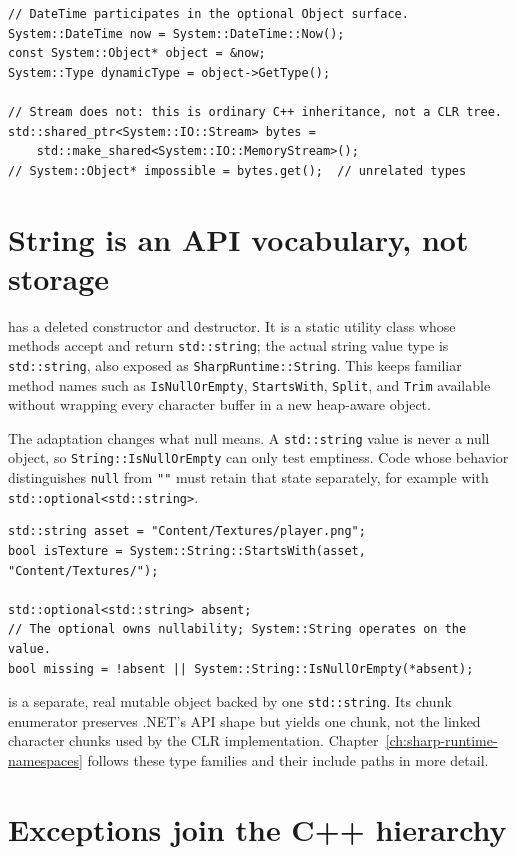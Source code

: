 \begin{lstlisting}
// DateTime participates in the optional Object surface.
System::DateTime now = System::DateTime::Now();
const System::Object* object = &now;
System::Type dynamicType = object->GetType();

// Stream does not: this is ordinary C++ inheritance, not a CLR tree.
std::shared_ptr<System::IO::Stream> bytes =
    std::make_shared<System::IO::MemoryStream>();
// System::Object* impossible = bytes.get();  // unrelated types
\end{lstlisting}

\section{String is an API vocabulary, not storage}

 has a deleted constructor and destructor. It is a static utility
class whose methods accept and return \texttt{std::string}; the actual string value type is
\texttt{std::string}, also exposed as \texttt{SharpRuntime::String}. This keeps familiar
method names such as \texttt{IsNullOrEmpty}, \texttt{StartsWith}, \texttt{Split}, and
\texttt{Trim} available without wrapping every character buffer in a new heap-aware object.

The adaptation changes what null means. A \texttt{std::string} value is never a null object,
so \texttt{String::IsNullOrEmpty} can only test emptiness. Code whose behavior distinguishes
\texttt{null} from \texttt{""} must retain that state separately, for example with
\texttt{std::optional<std::string>}.

\begin{lstlisting}
std::string asset = "Content/Textures/player.png";
bool isTexture = System::String::StartsWith(asset, "Content/Textures/");

std::optional<std::string> absent;
// The optional owns nullability; System::String operates on the value.
bool missing = !absent || System::String::IsNullOrEmpty(*absent);
\end{lstlisting}

 is a separate, real mutable object backed by one
\texttt{std::string}. Its chunk enumerator preserves .NET's API shape but yields one chunk,
not the linked character chunks used by the CLR implementation. Chapter~\ref{ch:sharp-runtime-namespaces}
follows these type families and their include paths in more detail.

\section{Exceptions join the C++ hierarchy}

